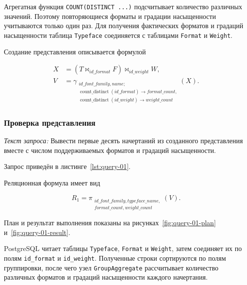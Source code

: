 
Агрегатная функция \texttt{COUNT(DISTINCT ...)} подсчитывает
количество различных значений. Поэтому повторяющиеся форматы и градации
насыщенности учитываются только один раз. Для получения фактических форматов
и градаций насыщенности таблица \texttt{Typeface} соединяется с
таблицами \texttt{Format} и \texttt{Weight}.

Создание представления описывается формулой

\[
\begin{aligned}
X &= \left(T \bowtie_{id\_format} F\right)
    \bowtie_{id\_weight} W,\\
V &= \gamma_{\substack{id\_font\_family,name;\\
\operatorname{count\_distinct}(id\_format) \rightarrow format\_count,\\
\operatorname{count\_distinct}(id\_weight) \rightarrow weight\_count}}(X).
\end{aligned}
\]

\subsubsection{Проверка представления}

\textit{Текст запроса:} Вывести первые десять начертаний из созданного представления вместе с числом
поддерживаемых форматов и градаций насыщенности.

Запрос приведён в листинге~\ref{lst:query-01}.


Реляционная формула имеет вид

\[
R_1 = \pi_{\substack{id\_font\_family,typeface\_name,\\
format\_count,weight\_count}}(V).
\]

План и результат выполнения показаны на
рисунках~\ref{fig:query-01-plan} и~\ref{fig:query-01-result}.


PostgreSQL читает таблицы \texttt{Typeface},
\texttt{Format} и \texttt{Weight}, затем соединяет их по
полям \texttt{id_format} и \texttt{id_weight}. Полученные
строки сортируются по полям группировки, после чего узел
\texttt{GroupAggregate} рассчитывает количество различных форматов
и градаций насыщенности каждого начертания.

